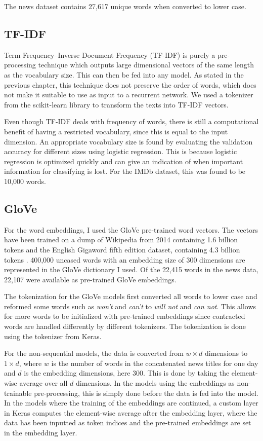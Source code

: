 The news dataset contains 27,617 unique words when converted to lower case. 

\subsection{TF-IDF}
Term Frequency--Inverse Document Frequency (TF-IDF) is purely a pre-processing technique which outputs large dimensional vectors of the same length as the vocabulary size. This can then be fed into any model. As stated in the previous chapter, this technique does not preserve the order of words, which does not make it suitable to use as input to a recurrent network. We used a tokenizer from the scikit-learn library to transform the texts into TF-IDF vectors. 

Even though TF-IDF deals with frequency of words, there is still a computational benefit of having a restricted vocabulary, since this is equal to the input dimension. An appropriate vocabulary size is found by evaluating the validation accuracy for different sizes using logistic regression. This is because logistic regression is optimized quickly and can give an indication of when important information for classifying is lost. For the IMDb dataset, this was found to be 10,000 words. 

\subsection{GloVe}

For the word embeddings, I used the GloVe pre-trained word vectors. The vectors have been trained on a dump of Wikipedia from 2014 containing 1.6 billion tokens and the English Gigaword fifth edition dataset, containing 4.3 billion tokens \citep{pennington2014glove}. 400,000 uncased words with an embedding size of 300 dimensions are represented in the GloVe dictionary I used. Of the 22,415 words in the news data, 22,107 were available as pre-trained GloVe embeddings. 

The tokenization for the GloVe models first converted all words to lower case and reformed some words such as \textit{won't} and \textit{can't} to \textit{will not} and \textit{can not}. This allows for more words to be initialized with pre-trained embeddings since contracted words are handled differently by different tokenizers. The tokenization is done using the tokenizer from Keras.  

For the non-sequential models, the data is converted from $w \times d$ dimensions to $1 \times d$, where $w$ is the number of words in the concatenated news titles for one day and $d$ is the embedding dimensions, here 300. This is done by taking the element-wise average over all $d$ dimensions. In the models using the embeddings as non-trainable pre-processing, this is simply done before the data is fed into the model. In the models where the training of the embeddings are continued, a custom layer in Keras computes the element-wise average after the embedding layer, where the data has been inputted as token indices and the pre-trained embeddings are set in the embedding layer.

